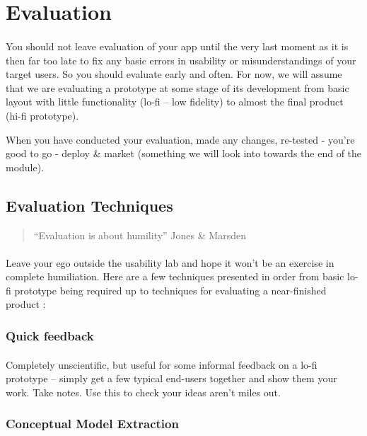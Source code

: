\documentclass[12pt, a4paper, twoside]{book}
\begin{document}
\section{Evaluation}
\paragraph{} You should not leave evaluation of your app until the very last moment as it is then far too late to fix any basic errors in usability or misunderstandings of your target users. So you should evaluate early and often. For now, we will assume that we are evaluating a prototype at some stage of its development from basic layout with little functionality (lo-fi – low fidelity) to almost the final product (hi-fi prototype).

When you have conducted your evaluation, made any changes, re-tested - you’re good to go - deploy \& market (something we will look into towards the end of the module).

\subsection{Evaluation Techniques}

\begin{quote}
``Evaluation is about humility'' Jones \& Marsden
\end{quote}

\paragraph{} Leave your ego outside the usability lab and hope it won't be an exercise in complete humiliation. Here are a few techniques presented in order from basic lo-fi prototype being required up to techniques for evaluating a near-finished product :

\subsubsection{Quick feedback}
\paragraph{} Completely unscientific, but useful for some informal feedback on a lo-fi prototype – simply get a few typical end-users together and show them your work. Take notes. Use this to check your ideas aren’t miles out.

\subsubsection{Conceptual Model Extraction}
\end{document}
